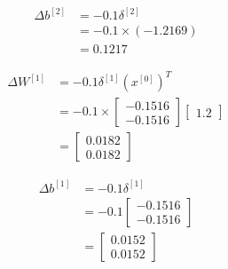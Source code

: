 \documentclass[12pt]{article}
\begin{document}
\begin{enumerate}[leftmargin=\labelsep]
\begin{paracol}{3}
\begin{footnotesize}
                  $$
                      \begin{aligned}
                          \Delta b^{[2]} & = -0.1 \delta^{[2]}     \\
                                         & = -0.1 \times (-1.2169) \\
                                         & = 0.1217
                      \end{aligned}
                  $$

                  $$
                      \begin{aligned}
                          \Delta W^{[1]} & = -0.1 \delta^{[1]} \left(x^{[0]}\right)^T \\
                                         & = -0.1 \times \begin{bmatrix}
                                                             -0.1516 \\
                                                             -0.1516
                                                         \end{bmatrix} \begin{bmatrix}
                                                                           1.2
                                                                       \end{bmatrix} \\
                                         & = \begin{bmatrix}
                                                 0.0182 \\
                                                 0.0182
                                             \end{bmatrix}
                      \end{aligned}
                  $$

                  $$
                      \begin{aligned}
                          \Delta b^{[1]} & = -0.1 \delta^{[1]}   \\
                                         & = -0.1 \begin{bmatrix}
                                                      -0.1516 \\
                                                      -0.1516
                                                  \end{bmatrix} \\
                                         & = \begin{bmatrix}
                                                 0.0152 \\
                                                 0.0152
                                             \end{bmatrix}
                      \end{aligned}
                  $$
              \end{footnotesize}


\end{paracol}
\end{enumerate}
\end{document}

